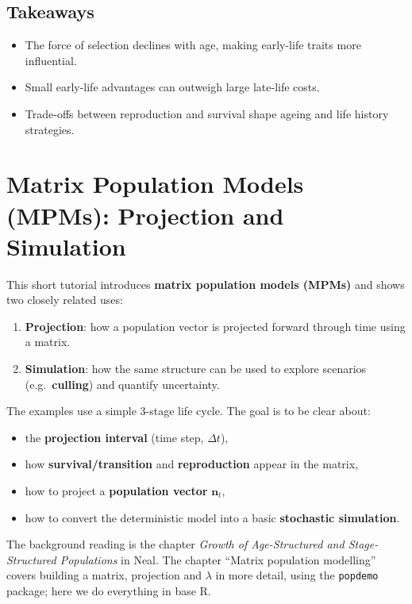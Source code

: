 \documentclass[
  a4paper]{book}
\providecommand{\tightlist}{%
  \setlength{\itemsep}{0pt}\setlength{\parskip}{0pt}}
\begin{document}
\section{Takeaways}\label{takeaways-12}

\begin{itemize}
\tightlist
\item
  The force of selection declines with age, making early-life traits more influential.
\item
  Small early-life advantages can outweigh large late-life costs.
\item
  Trade-offs between reproduction and survival shape ageing and life history strategies.
\end{itemize}

\chapter{Matrix Population Models (MPMs): Projection and Simulation}\label{matrix-population-models-mpms-projection-and-simulation}

This short tutorial introduces \textbf{matrix population models (MPMs)} and shows two closely related uses:

\begin{enumerate}
\def\labelenumi{\arabic{enumi}.}
\tightlist
\item
  \textbf{Projection}: how a population vector is projected forward through time using a matrix.
\item
  \textbf{Simulation}: how the same structure can be used to explore scenarios (e.g.~\textbf{culling}) and quantify uncertainty.
\end{enumerate}

The examples use a simple 3-stage life cycle. The goal is to be clear about:

\begin{itemize}
\tightlist
\item
  the \textbf{projection interval} (time step, \(\Delta t\)),
\item
  how \textbf{survival/transition} and \textbf{reproduction} appear in the matrix,
\item
  how to project a \textbf{population vector} \(\mathbf{n}_t\),
\item
  how to convert the deterministic model into a basic \textbf{stochastic simulation}.
\end{itemize}

The background reading is the chapter \emph{Growth of Age-Structured and Stage-Structured Populations} in Neal. The chapter ``Matrix population modelling'' covers building a matrix, projection and \(\lambda\) in more detail, using the \texttt{popdemo} package; here we do everything in base R.
\end{document}
